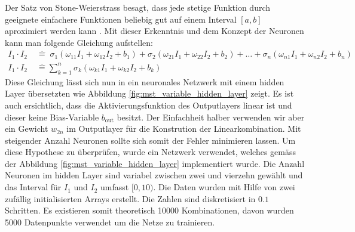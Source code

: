 Der Satz von Stone-Weierstrass besagt, dass jede stetige Funktion
durch geeignete einfachere Funktionen beliebig gut auf einem Interval
$[a, b]$ aproximiert werden kann \cite{wiki:StoneWeierstrass}. Mit
dieser Erkenntnis und dem Konzept der Neuronen kann man folgende
Gleichung aufstellen:
\begin{align}
I_{1} \cdot I_{2} \; & \hat{=} \; \sigma_{1} \left( \omega_{11} I_1 + \omega_{12} I_2 + b_{1} \right) + \sigma_{2} \left( \omega_{21} I_1 + \omega_{22} I_2 + b_{2}  \right) + \dots  + \sigma_{n} \left( \omega_{n1} I_1 + \omega_{n2} I_2 + b_{n} \right) \\
I_{1} \cdot I_{2} \; & \hat{=} \sum_{k=1}^{n} \sigma_{k} \left( \omega_{k1} I_1 + \omega_{k2} I_2 + b_{k} \right)
\label{eq:mst_traivial_sum}
\end{align}
Diese Gleichung lässt sich nun in ein neuronales Netzwerk mit einem
hidden Layer übersetzten wie Abbildung \ref{fig:mst_variable_hidden_layer}
zeigt. Es ist auch ersichtlich, dass die Aktivierungsfunktion des
Outputlayers linear ist und dieser keine Bias-Variable $b_{\text{out}}$
besitzt. Der Einfachheit halber verwenden wir aber ein Gewicht
$w_{2n}$ im Outputlayer für die Konstrution der Linearkombination.
%
Mit steigender Anzahl Neuronen sollte sich somit der Fehler minimieren
lassen. Um diese Hypothese zu überprüfen, wurde ein Netzwerk
verwendet, welches gemäss der Abbildung \ref{fig:mst_variable_hidden_layer}
implementiert wurde. Die Anzahl Neuronen im hidden Layer sind
variabel zwischen zwei und vierzehn gewählt und das Interval für
$I_1$ und $I_2$ umfasst $[0, 10)$. Die Daten wurden mit Hilfe von
zwei zufällig initialisierten Arrays erstellt. Die Zahlen sind
diskretisiert in $0.1$ Schritten. Es existieren somit theoretisch
10000 Kombinationen, davon wurden 5000 Datenpunkte verwendet um die
Netze zu trainieren.

